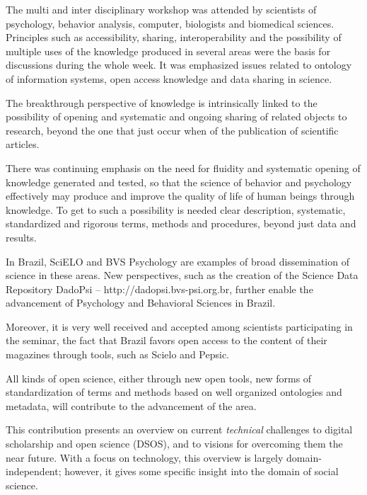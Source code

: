 \documentclass[a4paper,UKenglish]{dagrep}
\begin{document}
The multi and inter disciplinary workshop was attended by scientists of 
psychology, behavior analysis, computer, biologists and biomedical sciences. 
Principles such as accessibility, sharing, interoperability and the possibility of 
multiple uses of the knowledge produced in several areas were the basis for 
discussions during the whole week. It was emphasized issues related to 
ontology of information systems, open access knowledge and data sharing in 
science.

The breakthrough perspective of knowledge is intrinsically linked to the 
possibility of opening and systematic and ongoing sharing of related objects to 
research, beyond the one that just occur when of the publication of scientific 
articles.

There was continuing emphasis on the need for fluidity and systematic opening 
of knowledge generated and tested, so that the science of behavior and 
psychology effectively may produce and improve the quality of life of human 
beings through knowledge. To get to such a possibility is needed clear 
description, systematic, standardized and rigorous terms, methods and 
procedures, beyond just data and results.

In Brazil, SciELO and BVS Psychology are examples of broad dissemination of 
science in these areas. New perspectives, such as the creation of the Science 
Data Repository DadoPsi – http://dadopsi.bvs-psi.org.br, further enable the 
advancement of Psychology and Behavioral Sciences in Brazil.

Moreover, it is very well received and accepted among scientists participating 
in the seminar, the fact that Brazil favors open access to the content of their 
magazines through tools, such as Scielo and Pepsic.

All kinds of open science, either through new open tools, new forms of 
standardization of terms and methods based on well organized ontologies and 
metadata, will contribute to the advancement of the area. 


{}
\license
This contribution presents an overview on current \emph{technical} challenges to
digital scholarship and open science (DSOS), and to visions for overcoming them
the near future.
With a focus on technology, this overview is largely domain-independent;
however, it gives some specific insight into the domain of social science.
\end{document}
